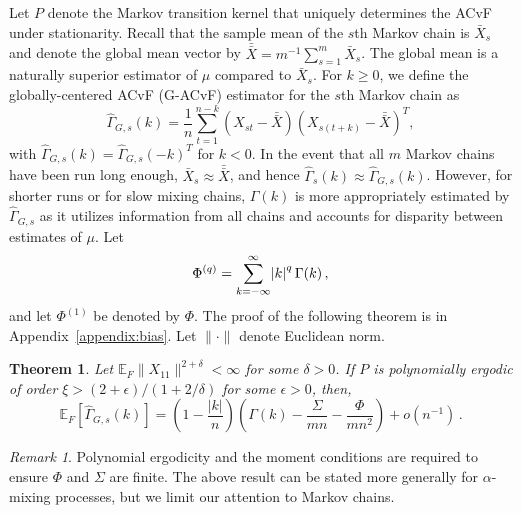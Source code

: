 \documentclass[12pt]{article}
\newcommand{\E}{\mathbb{E}}
\newtheorem{theorem}{Theorem}
\theoremstyle{remark}
\newtheorem{remark}{Remark}
\begin{document}
Let $P$ denote the Markov transition kernel that uniquely determines the ACvF under stationarity. Recall that the sample mean of the $s${th} Markov chain is $\bar{X}_s$ and denote the global mean vector by $\bar{\bar{X}} = m^{-1}\sum_{s = 1}^{m}\bar{X}_s$. The global mean is a naturally superior estimator of $\mu$ compared to $\bar{X}_s$. For $k \geq 0$, we define the globally-centered ACvF (G-ACvF) estimator for the $s${th} Markov chain as
%
\begin{equation} \label{eq:G-ACvF}
    \hat{\Gamma}_{G,s}(k) = \dfrac{1}{n} \sum_{t=1}^{n-k}(X_{st}-\bar{\bar{X}})(X_{s(t+k)}-\bar{\bar{X}})^T,
\end{equation}
with $\hat{\Gamma}_{G,s}(k) = \hat{\Gamma}_{G,s}(-k)^T$ for $k < 0$. In the event that all $m$ Markov chains have been run long enough, $\bar{X}_s \approx \bar{\bar{X}}$, and hence  $\hat{\Gamma}_{s} (k) \approx \hat{\Gamma}_{G,s}(k)$. However, for shorter runs or for slow mixing chains, $\Gamma(k)$ is more appropriately estimated by $\hat{\Gamma}_{G,s}$ as it utilizes information from all chains and accounts for disparity between estimates of $\mu$. 
Let 
\begin{equation*}
\Phi^{(q)} = \sum_{ k= -\infty}^{\infty}\abs{k}^q \Gamma(k)\,,  
\end{equation*}
%
and let $\Phi^{(1)}$ be denoted by $\Phi$.  The proof of the following theorem is in Appendix~\ref{appendix:bias}. Let $\|\cdot\|$ denote Euclidean norm. 


\begin{theorem} \label{th:G-ACF_bias} Let $\E_F \|X_{11}\|^{2 + \delta} < \infty$ for some $\delta > 0$. If $P$ is polynomially ergodic of order $\xi > (2 + \epsilon)/(1 + 2/\delta)$ for some $\epsilon > 0$,  then,
\[
   \mathbb{E}_F\left[\hat{\Gamma}_{G,s}(k) \right] = \left(1- \dfrac{|k|}{n}\right) \left(\Gamma(k) - \dfrac{\Sigma}{mn} - \dfrac{\Phi}{mn^2}\right)  + o \left(n^{-1} \right)\,.
\]
\end{theorem}

\begin{remark}
Polynomial ergodicity and the moment conditions are required to ensure $\Phi$ and $\Sigma$ are finite. The above result can be stated more generally for $\alpha$-mixing processes, but we limit our attention to Markov chains. 
\end{remark}
\end{document}
